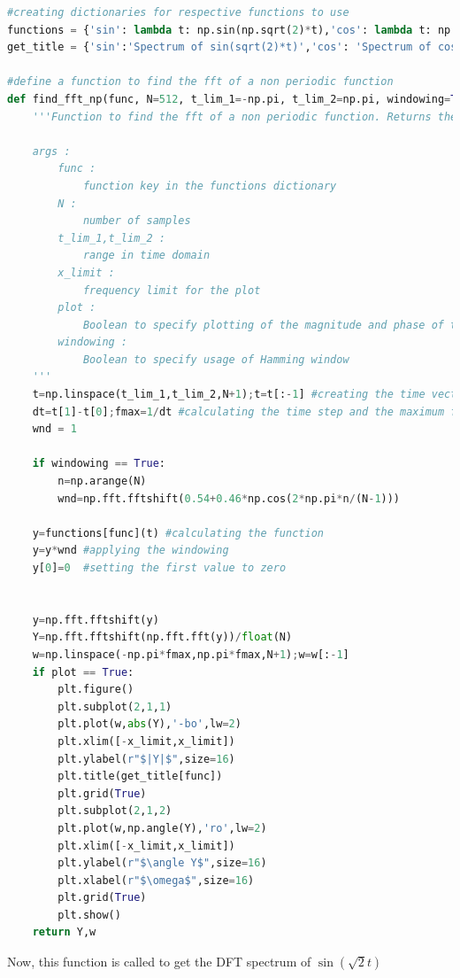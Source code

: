 \documentclass[11pt, a4paper]{article}
\begin{document}
\begin{lstlisting}[language = Python]
#creating dictionaries for respective functions to use
functions = {'sin': lambda t: np.sin(np.sqrt(2)*t),'cos': lambda t: np.cos(t), 'cos3': lambda t: np.cos(0.86*t)**3, 'chirp': lambda t: np.cos(16*t*(1.5+t/(2*np.pi)))}
get_title = {'sin':'Spectrum of sin(sqrt(2)*t)','cos': 'Spectrum of cos(t)', 'cos3': 'Spectrum of cos^3(0.86t)', 'chirp': 'Spectrum of cos(16*t*(1.5+t/(2*np.pi)))'}

#define a function to find the fft of a non periodic function
def find_fft_np(func, N=512, t_lim_1=-np.pi, t_lim_2=np.pi, windowing=True, x_limit=8, plot=True):
    '''Function to find the fft of a non periodic function. Returns the fft and the frequency array as : (fft,freqs)
    
    args :
        func :
            function key in the functions dictionary
        N : 
            number of samples
        t_lim_1,t_lim_2 : 
            range in time domain
        x_limit : 
            frequency limit for the plot
        plot : 
            Boolean to specify plotting of the magnitude and phase of the fft
        windowing :
            Boolean to specify usage of Hamming window
    '''    
    t=np.linspace(t_lim_1,t_lim_2,N+1);t=t[:-1] #creating the time vector
    dt=t[1]-t[0];fmax=1/dt #calculating the time step and the maximum frequency
    wnd = 1

    if windowing == True:
        n=np.arange(N)
        wnd=np.fft.fftshift(0.54+0.46*np.cos(2*np.pi*n/(N-1)))
    
    y=functions[func](t) #calculating the function
    y=y*wnd #applying the windowing
    y[0]=0  #setting the first value to zero


    y=np.fft.fftshift(y) 
    Y=np.fft.fftshift(np.fft.fft(y))/float(N) 
    w=np.linspace(-np.pi*fmax,np.pi*fmax,N+1);w=w[:-1]
    if plot == True:
        plt.figure()
        plt.subplot(2,1,1)
        plt.plot(w,abs(Y),'-bo',lw=2)
        plt.xlim([-x_limit,x_limit])
        plt.ylabel(r"$|Y|$",size=16)
        plt.title(get_title[func])
        plt.grid(True)
        plt.subplot(2,1,2)
        plt.plot(w,np.angle(Y),'ro',lw=2)
        plt.xlim([-x_limit,x_limit])
        plt.ylabel(r"$\angle Y$",size=16)
        plt.xlabel(r"$\omega$",size=16)
        plt.grid(True)
        plt.show()
    return Y,w
\end{lstlisting}

Now, this function is called to get the DFT spectrum of $\sin(\sqrt{2}t)$
\end{document}
